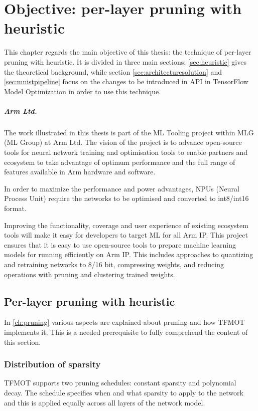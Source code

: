 \chapter{Objective: per-layer pruning with heuristic}\label{ch:objective}
This chapter regards the main objective of this thesis: the technique of
per-layer pruning with heuristic. It is divided in three main sections:
\autoref{sec:heuristic} gives the theoretical background, while section
\autoref{sec:architecturesolution} and \autoref{sec:mnistpipeline} focus on the
changes to be introduced in API in TensorFlow Model Optimization in order to
use this technique.

\paragraph{Arm Ltd.}
The work illustrated in this thesis is part of the ML Tooling project within
MLG (ML Group) at Arm Ltd.
The vision of the project is to advance open-source tools for neural network
training and optimisation tools to enable partners and ecosystem to take
advantage of optimum performance and the full range of features available in
Arm hardware and software.

In order to maximize the performance and power advantages, NPUs (Neural Process
Unit\cite{ethos-u65,ethos-n78}) require the networks to be optimised and
converted to int8/int16 format.

Improving the functionality, coverage and user experience of existing ecosystem
tools will make it easy for developers to target ML for all Arm IP\@.
This project ensures that it is easy to use open-source tools to prepare
machine learning models for running efficiently on Arm IP\@.
This includes approaches to quantizing and retraining networks to
8/16 bit, compressing weights, and reducing operations with pruning and
clustering trained weights.

\section{Per-layer pruning with heuristic}\label{sec:heuristic}
In \autoref{ch:pruning} various aspects are explained about pruning and how
TFMOT implements it. This is a needed prerequisite to fully comprehend the
content of this section.

\subsection{Distribution of sparsity}
TFMOT supports two pruning schedules: constant sparsity and polynomial decay.
The schedule specifies when and what sparsity to apply to the network and this
is applied equally across all layers of the network model.

